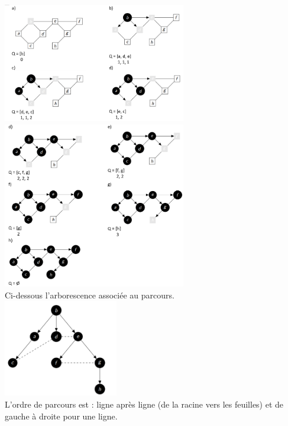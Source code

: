 \begin{Exercice}[10 minutes]
	\begin{solution}
		\includegraphics[width=8cm]{solutions/BFS1.PNG}\\
		\includegraphics[width=8cm]{solutions/BFS2.PNG}\\
 		Ci-dessous l'arborescence associée au parcours.\\
		\includegraphics[width=5cm]{solutions/BFS3.PNG}\\
		L’ordre de parcours est : ligne après ligne (de la racine vers les feuilles) et
		de gauche à droite pour une ligne.
	\end{solution}
\end{Exercice}

